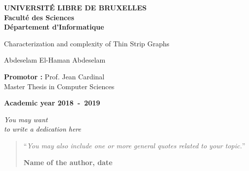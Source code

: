 \documentclass[11pt,a4paper,oneside]{book}
\theoremstyle{definition}
\theoremstyle{remark}
\theoremstyle{plain}
\numberwithin{theorem}{section}
\begin{document}
\frontmatter
\begin{titlepage}
\begin{center}
\textbf{UNIVERSIT\'E LIBRE DE BRUXELLES}\\
\textbf{Facult\'e des Sciences}\\
\textbf{D\'epartement d'Informatique}
\vfill{}\vfill{}

{\Huge  Characterization and complexity of \vspace*{.5cm} \linebreak[4] Thin Strip Graphs}


{\Huge \par}
\begin{center}{\LARGE Abdeselam El-Haman Abdeselam}\end{center}{\Huge \par}
\vfill{}\vfill{}
\begin{flushright}{\large \textbf{Promotor :} Prof. Jean Cardinal}\\\hfill{}{\large Master Thesis in Computer Sciences}\\
{\large }\hfill{}{}\end{flushright}{\large\par}
\vfill{}\vfill{}\enlargethispage{3cm}
\textbf{Academic year 2018~-~2019}
\end{center}
\end{titlepage}
\newpage
\thispagestyle{empty}
\null

\newenvironment{vcenterpage}
{\newpage\thispagestyle{empty}
\vspace*{\fill}}
{\vspace*{\fill}\par\pagebreak}

\begin{vcenterpage}
\begin{flushright}
    \large\em\null\vskip1in
    You may want\\
   to write a dedication here\vfill
  \end{flushright}
\end{vcenterpage}
\thispagestyle{empty}
\vspace*{5cm}

\begin{quotation}
\noindent ``\emph{You may also include one or more general quotes related to your topic.}''
\begin{flushright}\textbf{Name of the author, date}\end{flushright}
\end{quotation}
\end{document}
